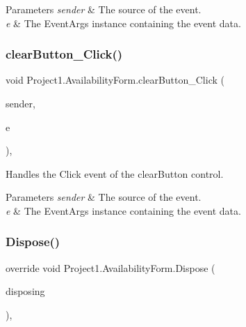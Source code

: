 \begin{DoxyParams}{Parameters}
{\em sender} & The source of the event.\\
\hline
{\em e} & The Event\+Args instance containing the event data.\\
\hline
\end{DoxyParams}
\mbox{\label{classProject1_1_1AvailabilityForm_a8e5527c2a2732aa00b88e8099f181ac4}} 
\subsubsection{\texorpdfstring{clear\+Button\+\_\+\+Click()}{clearButton\_Click()}}
{\footnotesize\ttfamily void Project1.\+Availability\+Form.\+clear\+Button\+\_\+\+Click (\begin{DoxyParamCaption}\item[{object}]{sender,  }\item[{Event\+Args}]{e }\end{DoxyParamCaption})\hspace{0.3cm}{\ttfamily [inline]}, {\ttfamily [private]}}



Handles the Click event of the clear\+Button control. 


\begin{DoxyParams}{Parameters}
{\em sender} & The source of the event.\\
\hline
{\em e} & The Event\+Args instance containing the event data.\\
\hline
\end{DoxyParams}
\mbox{\label{classProject1_1_1AvailabilityForm_a8f5f4544312a07be4a5c18a0c5f7f57b}} 
\subsubsection{\texorpdfstring{Dispose()}{Dispose()}}
{\footnotesize\ttfamily override void Project1.\+Availability\+Form.\+Dispose (\begin{DoxyParamCaption}\item[{bool}]{disposing }\end{DoxyParamCaption})\hspace{0.3cm}{\ttfamily [inline]}, {\ttfamily [protected]}}



